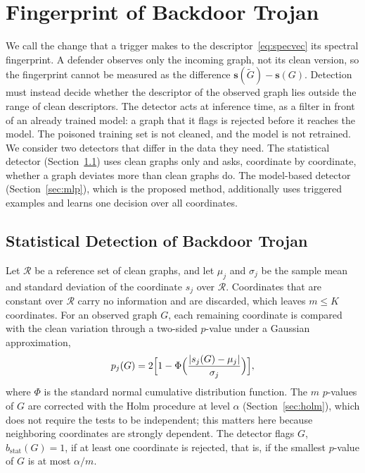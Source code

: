\documentclass[journal]{IEEEtran}
\newcommand{\bs}{\mathbf{s}}            %
\newcommand{\calR}{\mathcal{R}}         %
\begin{document}
\section{Fingerprint of Backdoor Trojan}\label{sec:fingerprint}
We call the change that a trigger makes to the descriptor~\eqref{eq:specvec}
its spectral fingerprint. A defender observes only the incoming graph, not its
clean version, so the fingerprint cannot be measured as the difference
$\bs(\tilde G)-\bs(G)$. Detection must instead decide whether the descriptor of
the observed graph lies outside the range of clean descriptors. The detector
acts at inference time, as a filter in front of an already trained model: a
graph that it flags is rejected before it reaches the model. The poisoned
training set is not cleaned, and the model is not retrained. We consider two
detectors that differ in the data they need. The statistical detector
(Section~\ref{sec:stat}) uses clean graphs only and asks, coordinate by
coordinate, whether a graph deviates more than clean graphs do. The
model-based detector (Section~\ref{sec:mlp}), which is the proposed method,
additionally uses triggered examples and learns one decision over all
coordinates.

\subsection{Statistical Detection of Backdoor Trojan}\label{sec:stat}
Let $\calR$ be a reference set of clean graphs, and let $\mu_j$ and $\sigma_j$ be
the sample mean and standard deviation of the coordinate $s_j$ over $\calR$.
Coordinates that are constant over $\calR$ carry no information and are
discarded, which leaves $m\le K$ coordinates. For an observed graph $G$, each
remaining coordinate is compared with the clean variation through a two-sided
$p$-value under a Gaussian approximation,
\begin{equation}
p_j(G)=2\Bigl[1-\Phi\Bigl(\frac{|s_j(G)-\mu_j|}{\sigma_j}\Bigr)\Bigr],
\label{eq:clean-reference-test}
\end{equation}
where $\Phi$ is the standard normal cumulative distribution function. The $m$
$p$-values of $G$ are corrected with the Holm procedure at level $\alpha$
(Section~\ref{sec:holm}), which does not require the tests to be independent;
this matters here because neighboring coordinates are strongly dependent. The
detector flags $G$, $\hat b_{\mathrm{stat}}(G)=1$, if at least one coordinate is
rejected, that is, if the smallest $p$-value of $G$ is at most $\alpha/m$.
\end{document}
